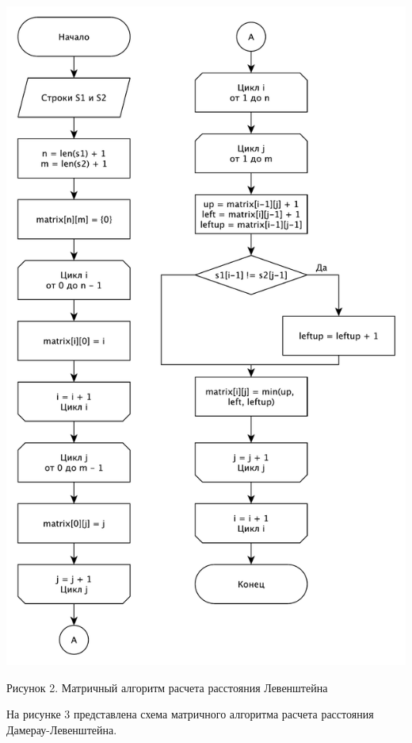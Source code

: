 \documentclass[a4paper,12pt]{article}
\begin{document}
\begin{center}
    \includegraphics[scale=0.7]{Lmatrix}

    Рисунок 2. Матричный алгоритм расчета расстояния Левенштейна
\end{center}

На рисунке 3 представлена схема матричного алгоритма расчета расстояния Дамерау-Левенштейна.
\end{document}
